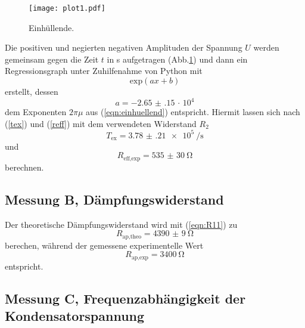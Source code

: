 \begin{figure}
  \centering
  \texttt{[image: plot1.pdf]}
  \caption{Einhüllende.}
  \label{fig:plot1}
\end{figure}
 Die positiven und negierten negativen Amplituden der Spannung $U$ werden gemeinsam
gegen die Zeit $t$ in s aufgetragen (Abb.\ref{fig:plot1}) und dann ein Regressionsgraph
unter Zuhilfenahme von Python mit
\begin{equation*}
  \text{exp}(ax+b)
\end{equation*}
erstellt, dessen
\begin{equation*}
   a = \num{-2.65(15)}\, \cdot\, 10^{4}
\end{equation*}
dem Exponenten $2\pi\mu$ aus (\ref{eqn:einhuellend}) entspricht.
Hiermit lassen sich nach (\ref{tex}) und (\ref{reff}) mit dem verwendeten Widerstand $R_{\text{2}}$
\begin{equation*}
   T_{\text{ex}} = \SI{3.78(21)e5}{\per\second}
\end{equation*}
und
\begin{equation*}
R_{\text{eff,exp}} = \SI{535(30)}{\ohm}
\end{equation*}
berechnen.



\subsection{Messung B, Dämpfungswiderstand}
Der theoretische Dämpfungswiderstand wird mit (\ref{eqn:R11}) zu
\begin{equation*}
  R_{\text{ap,theo}} = \SI{4390(9)}{\ohm}
\end{equation*}
  berechen, während der gemessene experimentelle Wert
\begin{equation*}
  R_{\text{ap,exp}} = \SI{3400}{\ohm}
\end{equation*}
entspricht.

\subsection{Messung C, Frequenzabhängigkeit der Kondensatorspannung}


